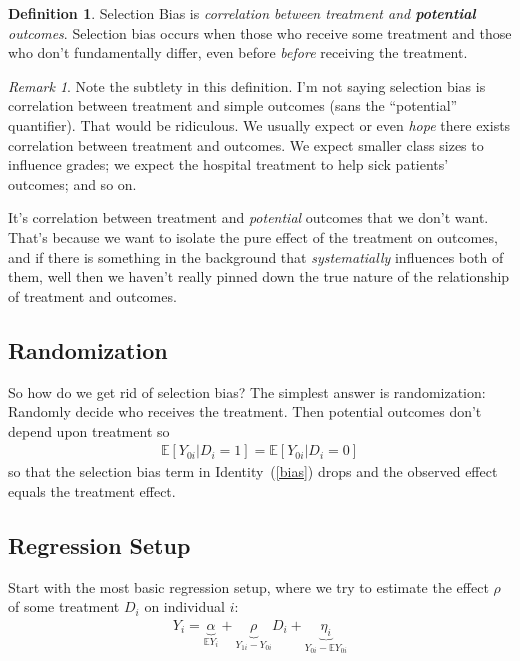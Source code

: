 \documentclass[12pt]{article}
\theoremstyle{plain}
\theoremstyle{definition}
\newtheorem{defn}[thm]{Definition}
\theoremstyle{remark}
\newtheorem*{rmk}{Remark}
\begin{document}
\begin{defn}
\label{defn:selbias}
Selection Bias is \emph{correlation between treatment and
\textbf{potential} outcomes}. Selection bias occurs when those who
receive some treatment and those who don't fundamentally differ, even
before \emph{before} receiving the treatment.
\end{defn}

\begin{rmk}
Note the subtlety in this definition. I'm not saying selection bias is
correlation between treatment and simple outcomes (sans the
``potential'' quantifier). That would be ridiculous. We usually expect
or even \emph{hope} there exists correlation between treatment and
outcomes. We expect smaller class sizes to influence grades; we expect the hospital treatment to help sick patients' outcomes; and so on.

It's correlation between treatment and \emph{potential} outcomes that we
don't want. That's because we want to isolate the pure effect of the
treatment on outcomes, and if there is something in the background that
\emph{systematially} influences both of them, well then we haven't
really pinned down the true nature of the relationship of treatment and
outcomes.
\end{rmk}

\subsection{Randomization}

So how do we get rid of selection bias? The simplest answer is
randomization: Randomly decide who receives the treatment. Then
potential outcomes don't depend upon treatment so
\begin{align*}
  \mathbb{E}[Y_{0i} | D_i=1]
  =\mathbb{E}[Y_{0i} | D_i=0]
\end{align*}
so that the selection bias term in Identity~(\ref{bias}) drops and the
observed effect equals the treatment effect.

\subsection{Regression Setup}

Start with the most basic regression setup, where we try to estimate the
effect $\rho$ of some treatment $D_i$ on individual $i$:
\begin{align}
  Y_i =
  \underbrace{\alpha}_{\mathbb{E}Y_i}
  + \underbrace{\rho}_{Y_{1i} - Y_{0i}} D_i
  + \underbrace{\eta_i}_{Y_{0i}-\mathbb{E}Y_{0i}}
  \label{basic}
\end{align}
\end{document}
